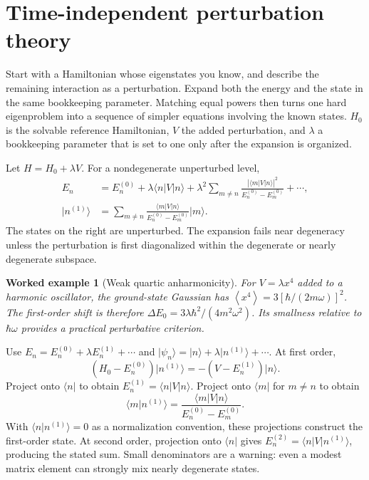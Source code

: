 \documentclass[11pt,oneside]{book}
\newcommand{\avg}[1]{\left\langle #1\right\rangle}
\newcommand{\ket}[1]{\lvert #1\rangle}
\newcommand{\bra}[1]{\langle #1\rvert}
\theoremstyle{reviewstyle}
\newtheorem{example}{Worked example}[chapter]
\begin{document}
\section{Time-independent perturbation theory}
Start with a Hamiltonian whose eigenstates you know, and describe the remaining interaction as a perturbation. Expand both the energy and the state in the same bookkeeping parameter. Matching equal powers then turns one hard eigenproblem into a sequence of simpler equations involving the known states. $H_0$ is the solvable reference Hamiltonian, $V$ the added perturbation, and $\lambda$ a bookkeeping parameter that is set to one only after the expansion is organized.

Let $H=H_0+\lambda V$. For a nondegenerate unperturbed level,
\begin{align}
E_n&=E_n^{(0)}+\lambda\bra n V\ket n+
\lambda^2\sum_{m\neq n}\frac{|\bra m V\ket n|^2}{E_n^{(0)}-E_m^{(0)}}+\cdots,\\
\ket{n^{(1)}}&=\sum_{m\neq n}\frac{\bra m V\ket n}{E_n^{(0)}-E_m^{(0)}}\ket m.
\end{align}
The states on the right are unperturbed. The expansion fails near degeneracy unless the perturbation is first diagonalized within the degenerate or nearly degenerate subspace.
\begin{example}[Weak quartic anharmonicity]
For $V=\lambda x^4$ added to a harmonic oscillator, the ground-state Gaussian has $\avg{x^4}=3[\hbar/(2m\omega)]^2$. The first-order shift is therefore $\Delta E_0=3\lambda\hbar^2/(4m^2\omega^2)$. Its smallness relative to $\hbar\omega$ provides a practical perturbative criterion.
\end{example}

Use $E_n=E_n^{(0)}+\lambda E_n^{(1)}+\cdots$ and $\ket{\psi_n}=\ket n+\lambda\ket{n^{(1)}}+\cdots$. At first order,
\begin{equation}
(H_0-E_n^{(0)})\ket{n^{(1)}}=-(V-E_n^{(1)})\ket n.
\end{equation}
Project onto $\bra n$ to obtain $E_n^{(1)}=\bra nV\ket n$. Project onto $\bra m$ for $m\ne n$ to obtain
\begin{equation}
\bra m n^{(1)}\rangle=\frac{\bra mV\ket n}{E_n^{(0)}-E_m^{(0)}}.
\end{equation}
With $\bra n n^{(1)}\rangle=0$ as a normalization convention, these projections construct the first-order state. At second order, projection onto $\bra n$ gives $E_n^{(2)}=\bra nV\ket{n^{(1)}}$, producing the stated sum. Small denominators are a warning: even a modest matrix element can strongly mix nearly degenerate states.
\end{document}
